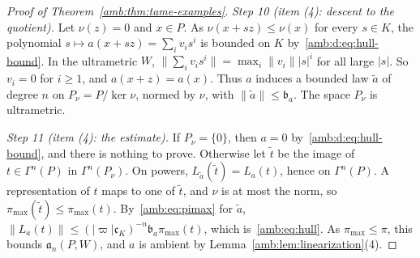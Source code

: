 \documentclass[11pt]{amsart}
\theoremstyle{definition}
\theoremstyle{remark}
\numberwithin{equation}{section}
\newcommand{\abs}[1]{\lvert #1\rvert}
\newcommand{\norm}[1]{\lVert #1\rVert}
\theoremstyle{plain}
\theoremstyle{definition}
\theoremstyle{plain}
\begin{document}
\begin{proof}[Proof of Theorem~\ref{amb:thm:tame-examples}]
\emph{Step 10 (item (4): descent to the quotient).} Let $\nu(z)=0$ and $x\in P$. As $\nu(x+sz)\le\nu(x)$ for every $s\in K$, the
polynomial $s\mapsto a(x+sz)=\sum_iv_is^i$ is bounded on $K$ by~\eqref{amb:d:eq:hull-bound}. In the ultrametric $W$,
$\norm{\sum_iv_is^i}=\max_i\norm{v_i}\abs s^i$ for all large $\abs s$. So $v_i=0$ for $i\ge1$, and $a(x+z)=a(x)$. Thus $a$
induces a bounded law $\tilde a$ of degree $n$ on $P_\nu=P/\ker\nu$, normed by $\nu$, with $\norm{\tilde a}\le \mathfrak b_a$. The
space $P_\nu$ is ultrametric.

\emph{Step 11 (item (4): the estimate).} If $P_\nu=\{0\}$, then $a=0$ by~\eqref{amb:d:eq:hull-bound}, and there is nothing to prove. Otherwise let $\tilde t$ be the image of $t\in\Gamma^n(P)$ in $\Gamma^n(P_\nu)$. On powers,
$L_{\tilde a}(\tilde t)=L_a(t)$, hence on $\Gamma^n(P)$. A representation of $t$ maps to one of $\tilde t$, and $\nu$ is at
most the norm, so $\pi_{\max}(\tilde t)\le\pi_{\max}(t)$. By~\eqref{amb:eq:pimax} for $\tilde a$,
$\norm{L_a(t)}\le(\abs\varpi\mathfrak c_K)^{-n}\mathfrak b_a\pi_{\max}(t)$, which is~\eqref{amb:eq:hull}. As $\pi_{\max}\le\pi$, this bounds
$\mathfrak a_n(P,W)$, and $a$ is ambient by Lemma~\ref{amb:lem:linearization}(4).
\end{proof}
\end{document}
